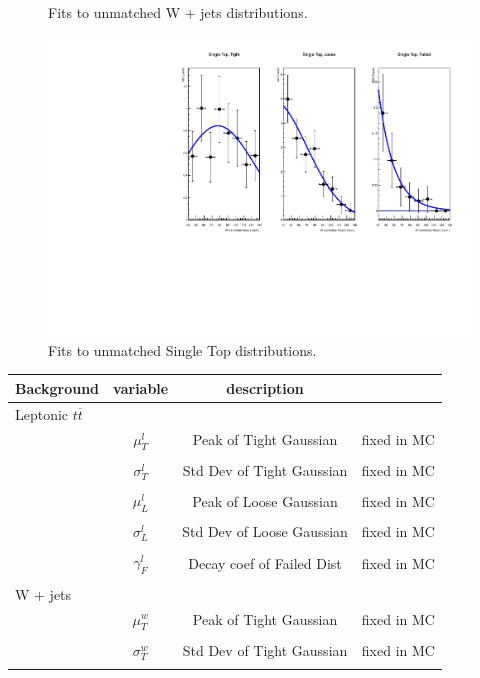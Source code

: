 \begin{}[h!]
\begin{figure}[h!]
\caption{Fits to unmatched W + jets distributions.}\label{fig:bkgII}
\end{figure}
\begin{figure}[h!]
\centering
\includegraphics[scale=0.87]{figs/WtagSF/SingleTop_fits.pdf}
\caption{Fits to unmatched Single Top distributions.}\label{fig:bkgIII}
\end{figure}
\begin{table}
\centering
\begin{tabular}{l | c  c  c}
Background & variable & description & \\
\hline\hline
Leptonic $t\overline{t}$ & & & \\
& $\mu^l_T$ & Peak of Tight Gaussian & fixed in MC\\
\\
& $\sigma^l_T$ & Std Dev of Tight Gaussian & fixed in MC\\
\\
& $\mu^l_L$ & Peak of Loose Gaussian & fixed in MC\\
\\
& $\sigma^l_L$ & Std Dev of Loose Gaussian & fixed in MC\\
\\
& $\gamma^l_F$ & Decay coef of Failed Dist & fixed in MC\\
\\
\hline
W + jets & & & \\
& $\mu^w_T$ & Peak of Tight Gaussian & fixed in MC\\
\\
& $\sigma^w_T$ & Std Dev of Tight Gaussian & fixed in MC\\
\\

\end{tabular}
\end{table}
\end{}
